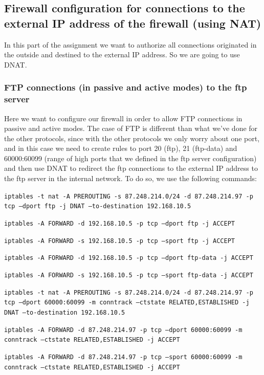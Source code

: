 \documentclass{article}
\begin{document}
\subsection{Firewall configuration for connections to the external IP address of the firewall (using NAT)}
\texttt{}\par In this part of the assignment we want to authorize all connections originated in the outside and destined to the external IP address. So we are going to use DNAT.


\subsubsection{FTP connections (in passive and active modes) to the ftp server}
\texttt{}\par Here we want to configure our firewall in order to allow FTP connections in passive and active modes. The case of FTP is different than what we've done for the other protocols, since with the other protocols we only worry about one port, and in this case we need to create rules to port 20 (ftp), 21 (ftp-data) and 60000:60099 (range of high ports that we defined in the ftp server configuration) and then use DNAT to redirect the ftp connections to the external IP address to the ftp server in the internal network. To do so, we use the following commands:

\texttt{}\par
\texttt{iptables -t nat -A PREROUTING -s 87.248.214.0/24 -d 87.248.214.97 -p tcp --dport ftp -j DNAT --to-destination 192.168.10.5}\par
\texttt{iptables -A FORWARD -d 192.168.10.5 -p tcp --dport ftp -j ACCEPT}\par
\texttt{iptables -A FORWARD -s 192.168.10.5 -p tcp --sport ftp -j ACCEPT}\par
\texttt{iptables -A FORWARD -d 192.168.10.5 -p tcp --dport ftp-data -j ACCEPT}\par
\texttt{iptables -A FORWARD -s 192.168.10.5 -p tcp --sport ftp-data -j ACCEPT}\par
\texttt{iptables -t nat -A PREROUTING -s 87.248.214.0/24 -d 87.248.214.97 -p tcp --dport 60000:60099 -m conntrack --ctstate RELATED,ESTABLISHED -j DNAT --to-destination 192.168.10.5
}\par
\texttt{iptables -A FORWARD -d 87.248.214.97 -p tcp --dport 60000:60099 -m conntrack --ctstate RELATED,ESTABLISHED -j ACCEPT
}\par
\texttt{iptables -A FORWARD -d 87.248.214.97 -p tcp --sport 60000:60099 -m conntrack --ctstate RELATED,ESTABLISHED -j ACCEPT
}\par
\texttt{}\par
\end{document}
